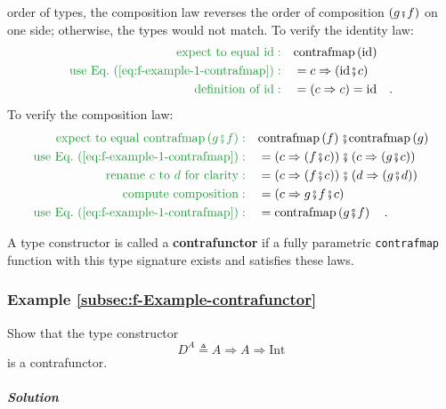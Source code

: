 order of types, the composition law reverses the order of composition
$\left(g\bef f\right)$ on one side; otherwise, the types would not
match. To verify the identity law:
\begin{align*}
{\color{greenunder}\text{expect to equal }\text{id}:}\quad & \text{contrafmap}\left(\text{id}\right)\\
{\color{greenunder}\text{use Eq.~(\ref{eq:f-example-1-contrafmap})}:}\quad & =c\Rightarrow(\text{id}\bef c)\\
{\color{greenunder}\text{definition of }\text{id}:}\quad & =\left(c\Rightarrow c\right)=\text{id}\quad.
\end{align*}
To verify the composition law:
\begin{align*}
{\color{greenunder}\text{expect to equal }\text{contrafmap}\left(g\bef f\right):}\quad & \text{contrafmap}\left(f\right)\bef\text{contrafmap}\left(g\right)\\
{\color{greenunder}\text{use Eq.~(\ref{eq:f-example-1-contrafmap})}:}\quad & =\left(c\Rightarrow(f\bef c)\right)\bef\left(c\Rightarrow(g\bef c)\right)\\
{\color{greenunder}\text{rename }c\text{ to }d\text{ for clarity}:}\quad & =\left(c\Rightarrow(f\bef c)\right)\bef\left(d\Rightarrow(g\bef d)\right)\\
{\color{greenunder}\text{compute composition}:}\quad & =\left(c\Rightarrow g\bef f\bef c\right)\\
{\color{greenunder}\text{use Eq.~(\ref{eq:f-example-1-contrafmap})}:}\quad & =\text{contrafmap}\left(g\bef f\right)\quad.
\end{align*}

A type constructor is called a \textbf{contrafunctor}
if a fully parametric \lstinline!contrafmap! function with this type
signature exists and satisfies these laws.

\subsubsection{Example \label{subsec:f-Example-contrafunctor}\ref{subsec:f-Example-contrafunctor}}

Show that the type constructor 
\[
D^{A}\triangleq A\Rightarrow A\Rightarrow\text{Int}
\]
is a contrafunctor.

\subparagraph{Solution}

